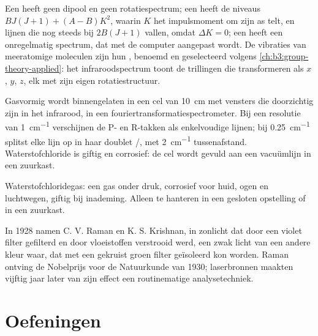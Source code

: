 Een  heeft geen dipool en geen rotatiespectrum; een
 heeft de niveaus $BJ(J+1) + (A - B)K^2$, waarin $K$ het
impulsmoment om zijn as telt,
en lijnen die nog steeds bij $2B(J+1)$ vallen, omdat $\Delta K = 0$; een
 heeft een onregelmatig spectrum, dat met de computer
aangepast wordt. De vibraties van meeratomige moleculen zijn hun
, benoemd en geselecteerd volgens
\cref{ch:b3:group-theory-applied}: het infraroodspectrum toont de
trillingen die transformeren als $x$, $y$, $z$, elk met zijn eigen
rotatiestructuur.

\begin{inthelab}
Gasvormig  wordt binnengelaten in een cel van \qty{10}{cm} met
vensters die doorzichtig zijn in het infrarood, in een
fouriertransformatiespectrometer. Bij een resolutie van \qty{1}{cm^{-1}}
verschijnen de P- en R-takken als enkelvoudige lijnen; bij \qty{0.25}{cm^{-1}} splitst elke
lijn op in haar doublet /, met \qty{2}{cm^{-1}}
tussenafstand. Waterstofchloride is giftig en corrosief: de cel wordt
gevuld aan een vacuümlijn in een zuurkast.
\end{inthelab}

\begin{safety}{}
Waterstofchloridegas: een gas onder druk, corrosief voor huid, ogen en
luchtwegen, giftig bij inademing. Alleen te hanteren in een gesloten
opstelling of in een zuurkast.
\end{safety}

\begin{history}[Raman, 1928]
In 1928 namen C. V. Raman en K. S. Krishnan, in zonlicht dat door een
violet filter gefilterd en door vloeistoffen verstrooid werd, een zwak licht
van een andere kleur waar, dat met een gekruist groen filter geïsoleerd
kon worden. Raman ontving de Nobelprijs voor de Natuurkunde van 1930;
laserbronnen maakten vijftig jaar later van zijn effect een
routinematige analysetechniek.
\end{history}

\section{Oefeningen}

